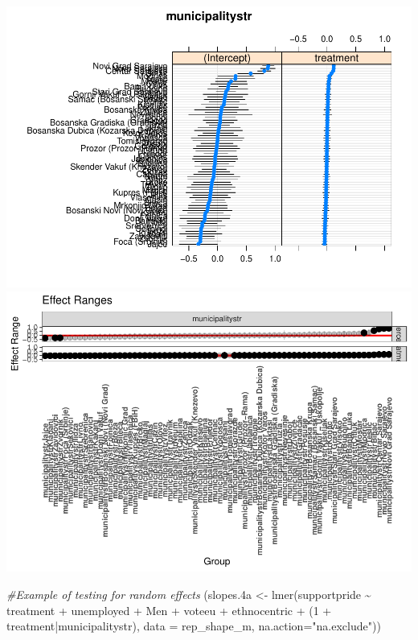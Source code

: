 \documentclass[
]{article}
\newenvironment{Shaded}{\begin{snugshade}}{\end{snugshade}}
\newcommand{\AttributeTok}[1]{\textcolor[rgb]{0.77,0.63,0.00}{#1}}
\newcommand{\CommentTok}[1]{\textcolor[rgb]{0.56,0.35,0.01}{\textit{#1}}}
\newcommand{\DecValTok}[1]{\textcolor[rgb]{0.00,0.00,0.81}{#1}}
\newcommand{\FloatTok}[1]{\textcolor[rgb]{0.00,0.00,0.81}{#1}}
\newcommand{\FunctionTok}[1]{\textcolor[rgb]{0.00,0.00,0.00}{#1}}
\newcommand{\NormalTok}[1]{#1}
\newcommand{\OtherTok}[1]{\textcolor[rgb]{0.56,0.35,0.01}{#1}}
\newcommand{\SpecialCharTok}[1]{\textcolor[rgb]{0.00,0.00,0.00}{#1}}
\newcommand{\StringTok}[1]{\textcolor[rgb]{0.31,0.60,0.02}{#1}}
\begin{document}
\includegraphics{SMI205_Assessment2_Template_files/figure-latex/random slopes plots-2.pdf}
\includegraphics{SMI205_Assessment2_Template_files/figure-latex/random slopes plots-3.pdf}

\begin{Shaded}
\begin{Highlighting}[]
\CommentTok{\#Example of testing for random effects}
\NormalTok{(slopes}\FloatTok{.4}\NormalTok{a }\OtherTok{\textless{}{-}} \FunctionTok{lmer}\NormalTok{(supportpride }\SpecialCharTok{\textasciitilde{}}\NormalTok{ treatment }\SpecialCharTok{+}\NormalTok{ unemployed }\SpecialCharTok{+}\NormalTok{ Men }\SpecialCharTok{+}\NormalTok{ voteeu }\SpecialCharTok{+}\NormalTok{ ethnocentric }\SpecialCharTok{+}\NormalTok{ (}\DecValTok{1} \SpecialCharTok{+}\NormalTok{ treatment}\SpecialCharTok{|}\NormalTok{municipalitystr),}
                   \AttributeTok{data =}\NormalTok{ rep\_shape\_m, }\AttributeTok{na.action=}\StringTok{"na.exclude"}\NormalTok{))}
\end{Highlighting}
\end{Shaded}
\end{document}
